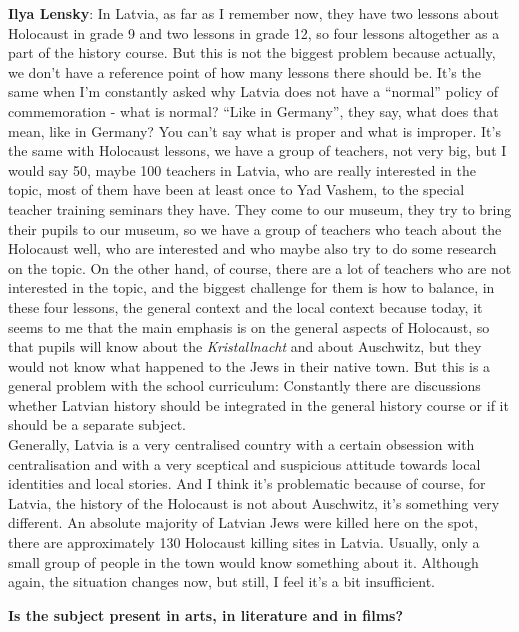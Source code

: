 \textbf{Ilya Lensky}: In Latvia, as far as I remember now, they have two lessons about Holocaust in grade 9 and two lessons in grade 12, so four lessons altogether as a part of the history course. But this is not the biggest problem because actually, we don’t have a reference point of how many lessons there should be. It's the same when I’m constantly asked why Latvia does not have a ``normal'' policy of commemoration - what is normal? ``Like in Germany'', they say, what does that mean, like in Germany?  You can’t say what is proper and what is improper. It's the same with Holocaust lessons, we have a group of teachers, not very big, but I would say 50, maybe 100 teachers in Latvia, who are really interested in the topic, most of them have been at least once to Yad Vashem, to the special teacher training seminars they have. They come to our museum, they try to bring their pupils to our museum, so we have a group of teachers who teach about the Holocaust well, who are interested and who maybe also try to do some research on the topic. On the other hand, of course, there are a lot of teachers who are not interested in the topic, and the biggest challenge for them is how to balance, in these four lessons, the general context and the local context because today, it seems to me that the main emphasis is on the general aspects of Holocaust, so that pupils will know about the \textit{Kristallnacht} and about Auschwitz, but they would not know what happened to the Jews in their native town. But this is a general problem with the school curriculum: Constantly there are discussions whether Latvian history should be integrated in the general history course or if it should be a separate subject.\\
Generally, Latvia is a very centralised country with a certain obsession with centralisation and with a very sceptical and suspicious attitude towards local identities and local stories. And I think it’s problematic because of course, for Latvia, the history of the Holocaust is not about Auschwitz, it’s something very different. An absolute majority of Latvian Jews were killed here on the spot, there are approximately 130 Holocaust killing sites in Latvia. Usually, only a small group of people in the town would know something about it. Although again, the situation changes now, but still, I feel it’s a bit insufficient. 

\textbf{Is the subject present in arts, in literature and in films?} 

